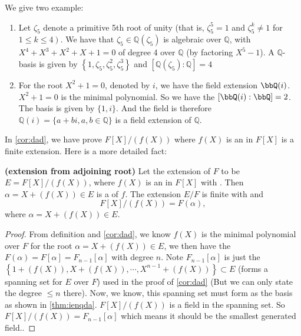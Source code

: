 \documentclass{article}
\newcommand{\bfs}[1]{\textbf{({#1}) }}
\begin{document}
\begin{exma}\label{ex:ehadnc}We give two example:
\begin{enumerate}
    \item Let $\zeta_{5}$ denote a primitive 5th root of unity (that is, $\zeta_{5}^{5}=1$ and $\zeta_{5}^{k} \neq 1$ for $\left.1 \leq k \leq 4\right)$. We have that $\zeta_{5} \in \mathbb{Q}\left(\zeta_{5}\right)$ is algebraic over $\mathbb{Q}$, with  $X^{4}+X^{3}+X^{2}+X+1=0$ of degree 4 over $\mathbb{Q}$ (by factoring $X^5-1$). A $\mathbb{Q}$-basis is given by $\left\{1, \zeta_{5}, \zeta_{5}^{2}, \zeta_{5}^{3}\right\}$ and $\left[\mathbb{Q}\left(\zeta_{5}\right): \mathbb{Q}\right]=4$
    \item For the root $X^2+1=0$, denoted by $i$, we have the field extension $\bbQ(i)$.  $X^2+1=0$ is the minimal polynomial. So we have the $[\bbQ(i): \bbQ]=2$. The basis is given by $\{1, i\}$. And the field is therefore $\mathbb{Q}(i)=\{a+b i, a, b \in \mathbb{Q}\}$ is a field extension of $\mathbb{Q}$.
\end{enumerate}

\end{exma}

In \cref{cor:dad}, we have prove $F[X]/(f(X))$ where $f(X)$ is an  in $F[X]$ is a finite extension. Here is a more detailed fact:
\begin{corx}\bfs{extension from adjoining root}\label{cor:uiuhnbn}
Let the extension of $F$ to be $E=F[X]/(f(X))$, where $f(X)$ is an  in $F[X]$ with . Then $\alpha = X+(f(X))\in E$ is a  of $f$. The extension $E/F$ is finite with  and $$F[X]/(f(X))=F(\alpha),$$
where $\alpha = X+(f(X))\in E$.
\end{corx}
\begin{proof}
From definition and \cref{cor:dad}, we know $f(X)$ is the minimal polynomial over $F$ for the root $\alpha = X+(f(X))\in E$, we then have the $F(\alpha)=F[\alpha]=F_{n-1}[\alpha]$ with degree $n$. 
Note $F_{n-1}[\alpha]$ is just the $\left\{1+(f(X)), X+(f(X)), \cdots, X^{n-1}+(f(X))\right\} \subset E$ (forms a spanning set for $E$ over $F$) used in the proof of \cref{cor:dad} (But we can only state the degree $\le n$ there). Now, we know, this spanning set must form as the basis as shown in \cref{thm:ienqda}. $F[X]/(f(X))$ is a field in the spanning set. So $F[X]/(f(X))=F_{n-1}[\alpha]$ which means it should be the smallest generated field..
\end{proof}
\end{document}
